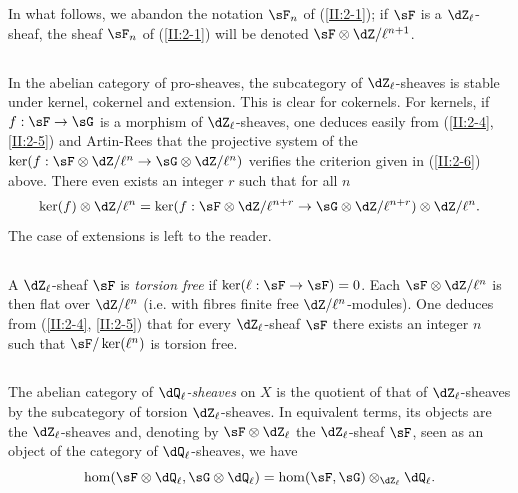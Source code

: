 In what follows, we abandon the notation $\sF_n$ of (\ref{II:2-1}); if
$\sF$ is a $\dZ_\ell$-sheaf, the sheaf $\sF_n$ of (\ref{II:2-1}) will be
denoted $\sF\otimes\dZ/\ell^{n+1}$.




\subsection{}\label{II:2-7}

In the abelian category of pro-sheaves, the subcategory of
$\dZ_\ell$-sheaves is stable under kernel, cokernel and extension. This is clear
for cokernels. For kernels, if $f:\sF\to\sG$ is a morphism of
$\dZ_\ell$-sheaves, one deduces easily from (\ref{II:2-4}, \ref{II:2-5})
and Artin-Rees that the projective system of the
$\ker(f:\sF\otimes\dZ/\ell^n\to\sG\otimes\dZ/\ell^n)$ verifies the criterion
given in (\ref{II:2-6}) above. There even exists an integer $r$ such that for
all $n$
\[
  \ker(f)\otimes\dZ/\ell^n = \ker(f:\sF\otimes\dZ/\ell^{n+r}\to\sG\otimes\dZ/\ell^{n+r})\otimes\dZ/\ell^n \text{.}
\]
The case of extensions is left to the reader.




\subsection{}\label{II:2-8}

A $\dZ_\ell$-sheaf $\sF$ is \emph{torsion free} if
$\ker(\ell:\sF\to\sF) = 0$. Each $\sF\otimes\dZ/\ell^n$ is then flat over
$\dZ/\ell^n$ (i.e. with fibres finite free $\dZ/\ell^n$-modules). One
deduces from (\ref{II:2-4}, \ref{II:2-5}) that for every $\dZ_\ell$-sheaf
$\sF$ there exists an integer $n$ such that $\sF/\ker(\ell^n)$ is torsion free.




\subsection{}\label{II:2-9}

The abelian category of \emph{$\dQ_\ell$-sheaves} on $X$ is the
quotient of that of $\dZ_\ell$-sheaves by the subcategory of
torsion $\dZ_\ell$-sheaves. In equivalent terms, its objects are the
$\dZ_\ell$-sheaves and, denoting by $\sF\otimes\dZ_\ell$ the $\dZ_\ell$-sheaf
$\sF$, seen as an object of the category of $\dQ_\ell$-sheaves, we have
\[
  \hom(\sF\otimes\dQ_\ell,\sG\otimes\dQ_\ell) = \hom(\sF,\sG)\otimes_{\dZ_\ell}\dQ_\ell \text{.}
\]

